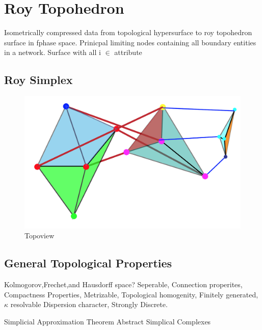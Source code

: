 \section{Roy Topohedron}
Isometrically compressed data from topological hypersurface to roy topohedron surface in fphase space. \newline
Prinicpal limiting nodes containing all boundary entities in a network. \newline
Surface with all i $\in$ attribute \newline
\subsection{Roy Simplex}


\begin{figure}[H]
  \includegraphics[width=\linewidth]{images/topoview}
  \caption{Topoview} %
  \label{topoview} 
\end{figure}

\subsection{General Topological Properties}
Kolmogorov,Frechet,and Hausdorff space?
Seperable,
Connection properites,
Compactness Properties,
Metrizable,
Topological homogenity,
Finitely generated,
$\kappa$ resolvable
Dispersion character,
Strongly Discrete.

Simplicial Approximation Theorem
Abstract Simplical Complexes

